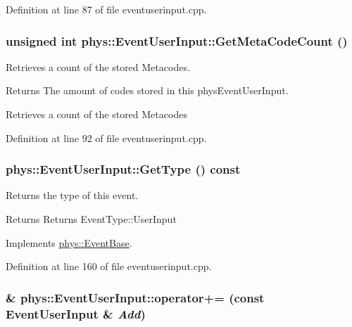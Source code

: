 Definition at line 87 of file eventuserinput.cpp.

\hypertarget{classphys_1_1EventUserInput_a17aa65dcf0ef8689affa50232eec4ccb}{
\subsubsection[{GetMetaCodeCount}]{\setlength{\rightskip}{0pt plus 5cm}unsigned int phys::EventUserInput::GetMetaCodeCount ()}}
\label{d7/df5/classphys_1_1EventUserInput_a17aa65dcf0ef8689affa50232eec4ccb}


Retrieves a count of the stored Metacodes. 

\begin{DoxyReturn}{Returns}
The amount of codes stored in this physEventUserInput.
\end{DoxyReturn}
Retrieves a count of the stored Metacodes 

Definition at line 92 of file eventuserinput.cpp.

\hypertarget{classphys_1_1EventUserInput_a3e803a8d9bcc1576fe04d2245a86ec80}{
\subsubsection[{GetType}]{ phys::EventUserInput::GetType () const}}
\label{d7/df5/classphys_1_1EventUserInput_a3e803a8d9bcc1576fe04d2245a86ec80}


Returns the type of this event. 

\begin{DoxyReturn}{Returns}
Returns EventType::UserInput 
\end{DoxyReturn}


Implements \hyperlink{classphys_1_1EventBase_a1b3d29b6ecf30f18cc3e1825a515c508}{phys::EventBase}.



Definition at line 160 of file eventuserinput.cpp.

\hypertarget{classphys_1_1EventUserInput_a1d6895e1b3814c1a63f5605b88ba85e5}{
\subsubsection[{operator+=}]{ \& phys::EventUserInput::operator+= (const {\bf EventUserInput} \& {\em Add})}}
\label{d7/df5/classphys_1_1EventUserInput_a1d6895e1b3814c1a63f5605b88ba85e5}


